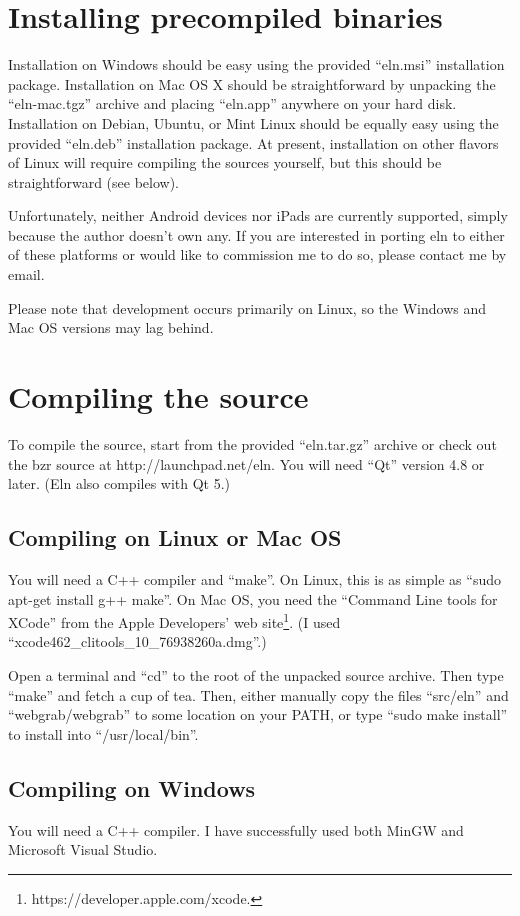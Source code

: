 \documentclass[11pt]{report}
\begin{document}
\section{Installing precompiled binaries}

Installation on Windows should be easy using the provided ``eln.msi''
installation package. Installation on Mac OS X should be
straightforward by unpacking the ``eln-mac.tgz'' archive and placing
``eln.app'' anywhere on your hard disk.  Installation on Debian,
Ubuntu, or Mint Linux should be equally easy using the provided
``eln.deb'' installation package. At present, installation on other
flavors of Linux will require compiling the sources yourself, but this
should be straightforward (see below).

Unfortunately, neither Android devices nor iPads are currently
supported, simply because the author doesn't own any. If you are
interested in porting eln to either of these platforms or would like
to commission me to do so, please contact me by email.

Please note that development occurs
primarily on Linux, so the Windows and Mac OS versions may lag
behind.

\section{Compiling the source}
To compile the source,  start from the provided
``eln.tar.gz'' archive or check out the bzr source at http://launchpad.net/eln. You will need
``Qt'' version 4.8 or later. (Eln also compiles with Qt 5.)

\subsection{Compiling on Linux or Mac OS}

You will need a C++ compiler and ``make''. On Linux, this is as simple
as ``sudo apt-get install g++ make''. On Mac OS, you need the
``Command Line tools for XCode'' from the Apple Developers' web
site\footnote{https://developer.apple.com/xcode.}. (I used ``xcode462\_clitools\_10\_76938260a.dmg''.)

Open a terminal and ``cd'' to the root of the unpacked source
archive. Then type ``make'' and fetch a cup of tea. Then, either
manually copy the files ``src/eln'' and
``webgrab/webgrab'' to some location on your PATH, or type ``sudo make
install'' to install into ``/usr/local/bin''.

\subsection{Compiling on Windows}
You will need a C++ compiler. I have successfully used both MinGW and
Microsoft Visual Studio.
\end{document}
